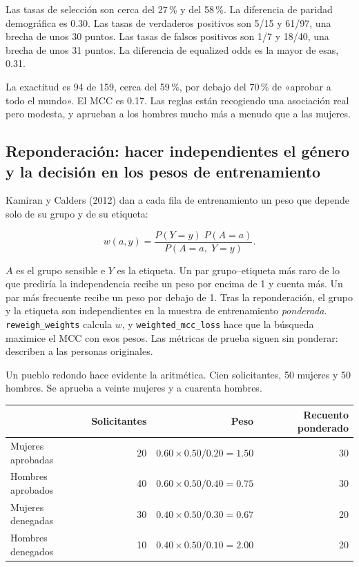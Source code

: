 \documentclass[11pt]{article}
\newcommand{\fn}[1]{\texttt{\small #1}}
\newcommand{\pct}[1]{\mbox{#1\,\%}}
\begin{document}
Las tasas de selección son cerca del \pct{27} y del \pct{58}. La diferencia de paridad demográfica es 0.30. Las tasas de verdaderos positivos son 5/15 y 61/97, una brecha de unos 30 puntos. Las tasas de falsos positivos son 1/7 y 18/40, una brecha de unos 31 puntos. La diferencia de equalized odds es la mayor de esas, 0.31.

La exactitud es 94 de 159, cerca del \pct{59}, por debajo del \pct{70} de «aprobar a todo el mundo». El MCC es 0.17. Las reglas están recogiendo una asociación real pero modesta, y aprueban a los hombres mucho más a menudo que a las mujeres.

\subsection{Reponderación: hacer independientes el género y la decisión en los pesos de entrenamiento}

Kamiran y Calders (2012) dan a cada fila de entrenamiento un peso que depende solo de su grupo y de su etiqueta:

\[
w(a, y)
=
\frac{P(Y = y)\; P(A = a)}{P(A = a,\; Y = y)}.
\]

\(A\) es el grupo sensible e \(Y\) es la etiqueta. Un par grupo--etiqueta más raro de lo que prediría la independencia recibe un peso por encima de 1 y cuenta más. Un par más frecuente recibe un peso por debajo de 1. Tras la reponderación, el grupo y la etiqueta son independientes en la muestra de entrenamiento \emph{ponderada}. \fn{reweigh\_weights} calcula \(w\), y \fn{weighted\_mcc\_loss} hace que la búsqueda maximice el MCC con esos pesos. Las métricas de prueba siguen sin ponderar: describen a las personas originales.

Un pueblo redondo hace evidente la aritmética. Cien solicitantes, 50 mujeres y 50 hombres. Se aprueba a veinte mujeres y a cuarenta hombres.

\begin{table}[H]
\centering
\small
\begin{tabular}{@{}l r r r@{}}
\toprule
 & Solicitantes & Peso & Recuento ponderado \\
\midrule
Mujeres aprobadas & 20 & \(0.60 \times 0.50 / 0.20 = 1.50\) & 30 \\
Hombres aprobados & 40 & \(0.60 \times 0.50 / 0.40 = 0.75\) & 30 \\
Mujeres denegadas & 30 & \(0.40 \times 0.50 / 0.30 = 0.67\) & 20 \\
Hombres denegados & 10 & \(0.40 \times 0.50 / 0.10 = 2.00\) & 20 \\
\bottomrule
\end{tabular}
\end{table}
\end{document}
